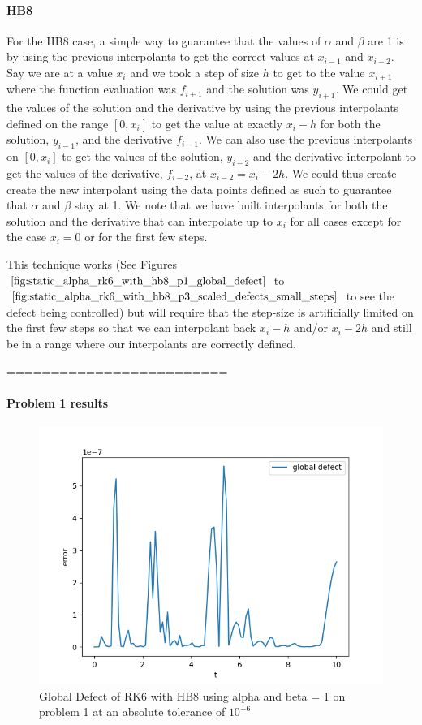 \documentclass{article}
\begin{document}
\paragraph{HB8} For the HB8 case, a simple way to guarantee that the values of $\alpha$ and $\beta$ are 1 is by using the previous interpolants to get the correct values at $x_{i - 1}$ and $x_{i - 2}$. Say we are at a value $x_i$ and we took a step of size $h$ to get to the value $x_{i + 1}$ where the function evaluation was $f_{i + 1}$ and the solution was $y_{i + 1}$. We could get the values of the solution and the derivative by using the previous interpolants defined on the range $[0, x_i]$ to get the value at exactly $x_i - h$ for both the solution, $y_{i - 1}$, and the derivative $f_{i - 1}$.  We can also use the previous interpolants on $[0, x_i]$ to get the values of the solution, $y_{i-2}$ and the derivative interpolant to get the values of the derivative, $f_{i - 2}$, at $x_{i-2} = x_i - 2h$. We could thus create create the new interpolant using the data points defined as such to guarantee that $\alpha$ and $\beta$ stay at 1. We note that we have built interpolants for both the solution and the derivative that  can interpolate up to $x_i$ for all cases except for the case $x_i = 0$ or for the first few steps.

This technique works (See Figures $\ref{fig:static_alpha_rk6_with_hb8_p1_global_defect}$ to $\ref{fig:static_alpha_rk6_with_hb8_p3_scaled_defects_small_steps}$ to see the defect being controlled) but will require that the step-size is artificially limited on the first few steps so that we can interpolant back $x_i - h$ and/or $x_i - 2h$ and still be in a range where our interpolants are correctly defined. 

=========================
\paragraph{Problem 1 results}
\begin{figure}[H]
\centering
\includegraphics[width=0.7\linewidth]{./figures/static_alpha_rk6_with_hb8_p1_global_defect}
\caption{Global Defect of RK6 with HB8 using alpha and beta = 1 on problem 1 at an absolute tolerance of $10^{-6}$}
\label{fig:static_alpha_rk6_with_hb8_p1_global_defect}
\end{figure}
\end{document}

